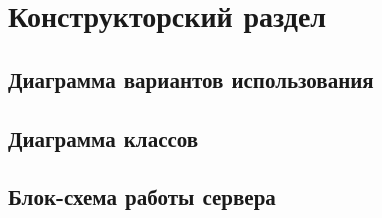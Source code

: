 \section{Конструкторский раздел}

\subsection{Диаграмма вариантов использования}

\subsection{Диаграмма классов}

\subsection{Блок-схема работы сервера}
\pagebreak